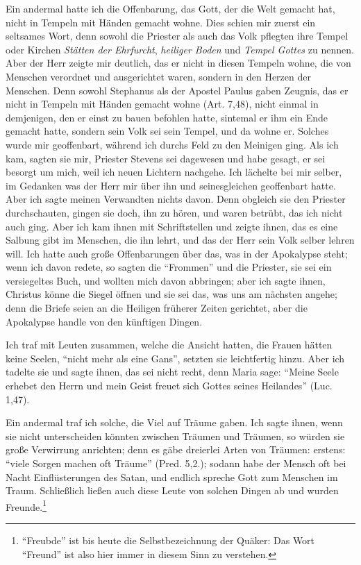 Ein andermal hatte ich die Offenbarung, das Gott, der die
Welt gemacht hat, nicht in Tempeln mit Händen gemacht wohne.
Dies schien mir zuerst ein seltsames Wort, denn sowohl die
Priester als auch das Volk pflegten ihre Tempel oder Kirchen
\textit{Stätten der Ehrfurcht}, \textit{heiliger Boden} und \textit{Tempel Gottes}
zu nennen. Aber der Herr zeigte mir deutlich, das er nicht
in diesen Tempeln wohne, die von Menschen verordnet und
ausgerichtet waren, sondern in den Herzen der Menschen. Denn
sowohl Stephanus als der Apostel Paulus gaben Zeugnis,
das er nicht in Tempeln mit Händen gemacht wohne (Art. 7,48),
nicht einmal in demjenigen, den er einst zu bauen befohlen hatte,
sintemal er ihm ein Ende gemacht hatte, sondern sein Volk sei
sein Tempel, und da wohne er. Solches wurde mir geoffenbart,
während ich durchs Feld zu den Meinigen ging. Als ich kam,
sagten sie mir, Priester Stevens sei dagewesen und habe gesagt,
er sei besorgt um mich, weil ich neuen Lichtern nachgehe. Ich
lächelte bei mir selber, im Gedanken was der Herr mir über ihn
und seinesgleichen geoffenbart hatte. Aber ich sagte meinen 
Verwandten nichts davon. Denn obgleich sie den Priester durchschauten, 
gingen sie doch, ihn zu hören, und waren betrübt, das
ich nicht auch ging. Aber ich kam ihnen mit Schriftstellen und
zeigte ihnen, das es eine Salbung gibt im Menschen, die ihn
lehrt, und das der Herr sein Volk selber lehren will. Ich hatte
auch große Offenbarungen über das, was in der Apokalypse steht;
wenn ich davon redete, so sagten die "`Frommen"' und die Priester,
sie sei ein versiegeltes Buch, und wollten mich davon abbringen;
aber ich sagte ihnen, Christus könne die Siegel öffnen und sie
sei das, was uns am nächsten angehe; denn die Briefe seien an
die Heiligen früherer Zeiten gerichtet, aber die Apokalypse handle
von den künftigen Dingen.

Ich traf mit Leuten zusammen, welche die Ansicht hatten,
die Frauen hätten keine Seelen, "`nicht mehr als eine Gans"',
setzten sie leichtfertig hinzu. Aber ich tadelte sie und sagte ihnen,
das sei nicht recht, denn Maria sage: "`Meine Seele erhebet den
Herrn und mein Geist freuet sich Gottes seines Heilandes"' (Luc. 1,47).

Ein andermal traf ich solche, die Viel auf Träume gaben.
Ich sagte ihnen, wenn sie nicht unterscheiden könnten zwischen
Träumen und Träumen, so würden sie große Verwirrung anrichten; 
denn es gäbe dreierlei Arten von Träumen: erstens:
"`viele Sorgen machen oft Träume"' (Pred. 5,2.); sodann habe der
Mensch oft bei Nacht Einflüsterungen des Satan, und endlich
spreche Gott zum Menschen im Traum. Schließlich ließen auch
diese Leute von solchen Dingen ab und wurden Freunde.\footnote{"`Freubde"' 
ist bis heute die Selbstbezeichnung der Quäker: Das Wort
"`Freund"' ist also hier immer in diesem Sinn zu verstehen.}

